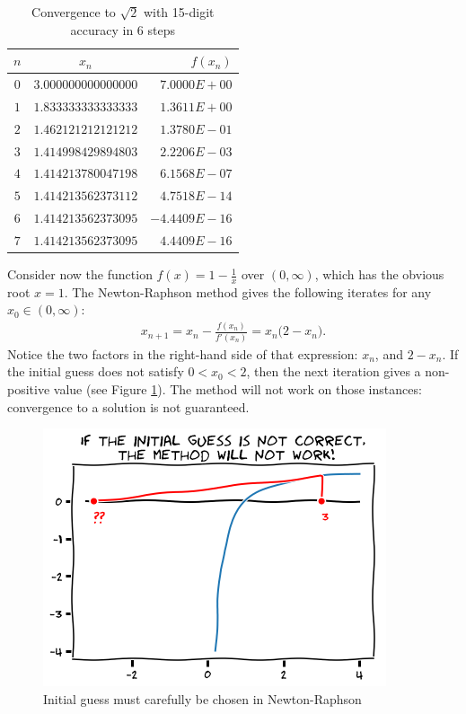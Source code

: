 \begin{example}
\begin{table}[ht!]
\begin{tabular}{|c|c|r|} \hline 
$n$ & $x_n$ & $f(x_n)$ \\ \hline \hline 
$0$ & $3.000000000000000$ & $7.0000E+00$ \\ \hline 
$1$ & $1.833333333333333$ & $1.3611E+00$ \\ \hline 
$2$ & $1.462121212121212$ & $1.3780E-01$ \\ \hline 
$3$ & $1.414998429894803$ & $2.2206E-03$ \\ \hline 
$4$ & $1.414213780047198$ & $6.1568E-07$ \\ \hline 
$5$ & $1.414213562373112$ & $4.7518E-14$ \\ \hline 
$6$ & $1.414213562373095$ & $-4.4409E-16$ \\ \hline 
$7$ & $1.414213562373095$ & $4.4409E-16$ \\ \hline 
\end{tabular}
\caption{Convergence to $\sqrt{2}$ with 15-digit accuracy in 6 steps}
\label{table:Newton-Raphson}
\end{table}
\end{example}

\begin{example}\label{example:NewtonRaphsonChoice}
Consider now the function $f(x) = 1-\tfrac{1}{x}$ over $(0, \infty)$, which has the obvious root $x=1$. The Newton-Raphson method gives the following iterates for any $x_0 \in (0,\infty)$:
\begin{align*}
x_{n+1} = x_n - \frac{f(x_n)}{f'(x_n)} = x_n \big( 2- x_n \big).
\end{align*}
Notice the two factors in the right-hand side of that expression: $x_n$, and $2-x_n$.  If the initial guess does not satisfy $0<x_0<2$, then the next iteration gives a non-positive value (see Figure \ref{figure:NewtonRaphsonChoice}).  The method will not work on those instances: convergence to a solution is not guaranteed.
\begin{figure}[ht!]
\includegraphics[width=0.65\linewidth]{badNewton.png}
\caption{Initial guess must carefully be chosen in Newton-Raphson}
\label{figure:NewtonRaphsonChoice}
\end{figure}
\end{example}

